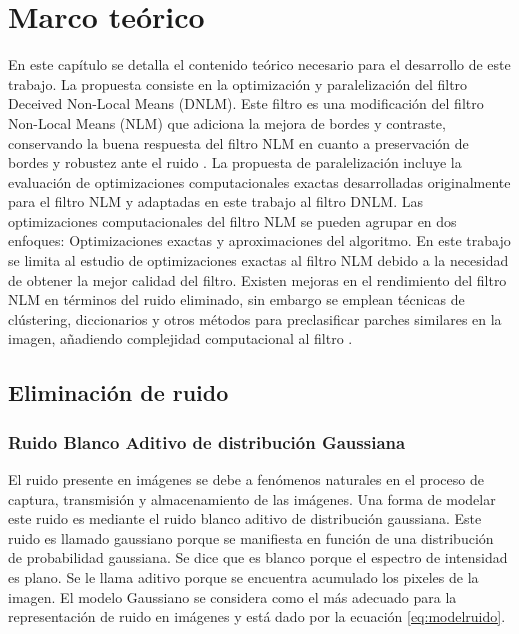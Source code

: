\chapter{Marco teórico}
\label{ch:marco}


En este cap\'itulo se detalla el contenido te\'orico necesario para el desarrollo de este trabajo. La propuesta consiste en la optimizaci\'on y paralelizaci\'on del filtro Deceived Non-Local Means (DNLM). Este filtro es una modificaci\'on del filtro Non-Local Means (NLM) que adiciona la mejora de bordes y contraste, conservando la buena respuesta del filtro NLM en cuanto a preservaci\'on de bordes y robustez ante el ruido \cite{calderon2015dewaff}. La propuesta de paralelizaci\'on incluye la evaluaci\'on de optimizaciones computacionales exactas desarrolladas originalmente para el filtro NLM y adaptadas en este trabajo al filtro DNLM. Las optimizaciones computacionales del filtro NLM se pueden agrupar en dos enfoques: Optimizaciones exactas y aproximaciones del algoritmo.  En este trabajo se limita al estudio de optimizaciones exactas al filtro NLM debido a la necesidad de obtener la mejor calidad del filtro. Existen mejoras en el rendimiento del filtro NLM en t\'erminos del ruido eliminado, sin embargo se emplean t\'ecnicas de cl\'ustering, diccionarios y otros m\'etodos para preclasificar parches similares en la imagen, a\~nadiendo complejidad computacional al filtro \cite{pardoNLM:2018,Chan2013,Tasdizen2009,Chatterjee2008,JI20091238,Karam2018}. 



\section{Eliminaci\'on de ruido}

\subsection{Ruido Blanco Aditivo de distribuci\'on Gaussiana}
\label{ch:marco_agwn}

El ruido presente en im\'agenes se debe a fen\'omenos naturales en el proceso de captura, transmisi\'on y almacenamiento de las im\'agenes. 	Una forma de modelar este ruido es mediante el ruido blanco aditivo de distribuci\'on gaussiana. Este ruido es llamado gaussiano porque se manifiesta en funci\'on de una distribuci\'on de probabilidad gaussiana. Se dice que es blanco porque el espectro de intensidad es plano. Se le llama aditivo porque se encuentra acumulado los pixeles de la imagen. El modelo Gaussiano se considera como el m\'as adecuado para la representaci\'on de ruido en im\'agenes y est\'a dado por la ecuaci\'on \ref{eq:modelruido}.


